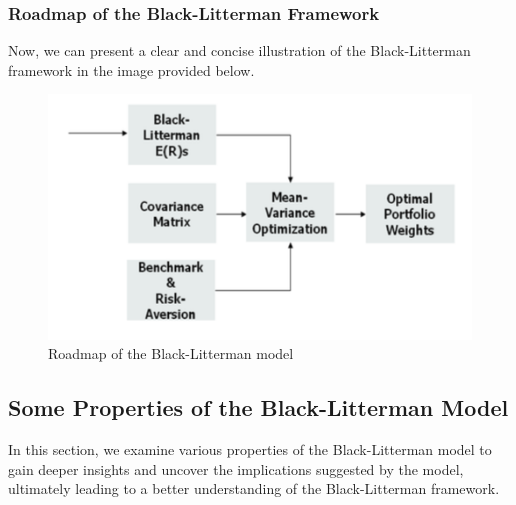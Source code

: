 \documentclass[13pt]{article}
\theoremstyle{definition}
\theoremstyle{remark}
\begin{document}
\subsubsection{Roadmap of the Black-Litterman Framework}
Now, we can present a clear and concise illustration of the Black-Litterman framework in the image provided below.

\begin{figure}[!htp]
    \centering
    \includegraphics{black_litterman.png}
    \caption{Roadmap of the Black-Litterman model}
    \label{fig:roadmap for Black-Litterman model}
\end{figure}

\subsection{Some Properties of the Black-Litterman Model}
In this section, we examine various properties of the Black-Litterman model to gain deeper insights and uncover the implications suggested by the model, ultimately leading to a better understanding of the Black-Litterman framework.
\end{document}
